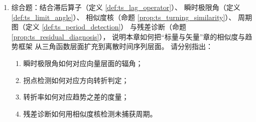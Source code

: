 \begin{enumerate}[leftmargin=3em, label=\textbf{题 \arabic*}]
    \item 综合题：结合滞后算子（定义 \ref{def:ts_lag_operator}）、
    瞬时极限角（定义 \ref{def:ts_limit_angle}）、
    相似度核（命题 \ref{prop:ts_turning_similarity}）、
    周期图（定义 \ref{def:ts_period_detection}）
    与残差诊断（命题 \ref{prop:ts_residual_diagnosis}），
    说明本章如何把“标量与矢量”章的相似度与趋势框架
    从三角函数层面扩充到离散时间序列层面。
    请分别指出：
    \begin{enumerate}[label=(\roman*)]
        \item 瞬时极限角如何对应向量层面的辐角；
        \item 拐点检测如何对应方向转折判定；
        \item 转折率如何对应趋势之差的度量；
        \item 残差诊断如何用相似度核检测未捕获周期。
    \end{enumerate}
\end{enumerate}


